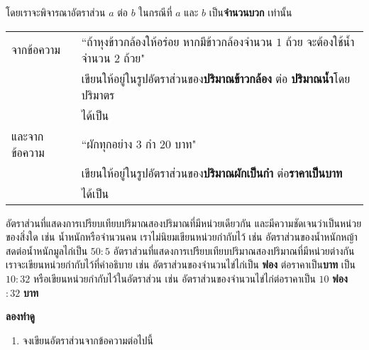 \documentclass[
  a4paper,
  DIV=11,
  numbers=noendperiod]{scrartcl}
\providecommand{\tightlist}{%
  \setlength{\itemsep}{0pt}\setlength{\parskip}{0pt}}
\begin{document}
\vspace{-7pt}

โดยเราจะพิจารณาอัตราส่วน \(a\) ต่อ \(b\) ในกรณีที่ \(a\) และ \(b\)
เป็น\textbf{จำนวนบวก} เท่านั้น

\begin{tabular}{lp{12cm}}

จากข้อความ & ``ถ้าหุงข้าวกล้องให้อร่อย หากมีข้าวกล้องจำนวน $1$ ถ้วย จะต้องใช้น้ำจำนวน $2$ ถ้วย" \\

          & เขียนให้อยู่ในรูปอัตราส่วนของ\textbf{ปริมาณข้าวกล้อง} ต่อ \textbf{ปริมาณน้ำ}โดยปริมาตร \\
          & ได้เป็น \dotfill \\

และจากข้อความ  & ``ผักทุกอย่าง $3$ กำ $20$ บาท" \\

          & เขียนให้อยู่ในรูปอัตราส่วนของ\textbf{ปริมาณผักเป็นกำ} ต่อ\textbf{ราคาเป็นบาท}\\
          & ได้เป็น \dotfill \\

\end{tabular}

\begin{tcolorbox}[colback=white!5!white,
colframe=red!70!black]

อัตราส่วนที่แสดงการเปรียบเทียบปริมาณสองปริมาณที่มีหน่วยเดียวกัน และมีความชัดเจนว่าเป็นหน่วยของสิ่งใด เช่น น้ำหนักหรือจำนวนคน เราไม่นิยมเขียนหน่วยกำกับไว้
เช่น อัตราส่วนของน้ำหนักหญ้าสดต่อน้ำหนักมูลไก่เป็น $50:5$
\tcblower
อัตราส่วนที่แสดงการเปรียบเทียบปริมาณสองปริมาณที่มีหน่วยต่างกัน เราจะเขียนหน่วยกำกับไว้ที่คำอธิบาย เช่น อัตราส่วนของจำนวนไข่ไก่เป็น \textbf{ฟอง} ต่อราคาเป็น\textbf{บาท} เป็น $10:32$ หรือเขียนหน่วยกำกับไว้ในอัตราส่วน เช่น อัตราส่วนของจำนวนไข่ไก่ต่อราคาเป็น $10$ \textbf{ฟอง} $: 32$ \textbf{บาท}
\end{tcolorbox}

\newpage
\centering
\begin{tcolorbox}[colback=white!5!white,
colframe=red!70!black,width=5cm]
\centering \textbf{ลองทำดู}
\end{tcolorbox}

\flushleft

\begin{enumerate}
\def\labelenumi{\arabic{enumi}.}
\tightlist
\item
  จงเขียนอัตราส่วนจากข้อความต่อไปนี้
\end{enumerate}
\end{document}
